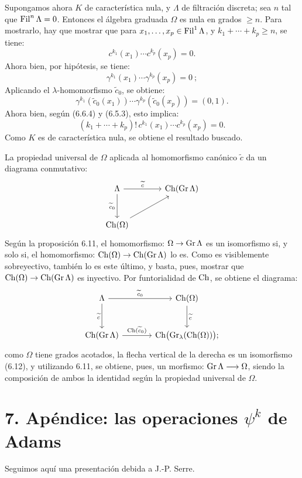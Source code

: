 Supongamos ahora \(K\) de característica nula, y \(\Lambda\) de filtración discreta; sea \(n\) tal que \(\operatorname{Fil}^n\Lambda=0\). Entonces el álgebra graduada \(\Omega\) es nula en grados \(\ge n\). Para mostrarlo, hay que mostrar que para \(x_1,\ldots,x_p\in\operatorname{Fil}^1\Lambda\), y \(k_1+\cdots+k_p\ge n\), se tiene:
\[
  c^{k_1}(x_1)\cdots c^{k_p}(x_p)=0.
\]
Ahora bien, por hipótesis, se tiene:
\[
  \gamma^{k_1}(x_1)\cdots\gamma^{k_p}(x_p)=0\ ;
\]
Aplicando el \(\lambda\)-homomorfismo \(\widetilde c_0\), se obtiene:
\[
  \gamma^{k_1}(\widetilde c_0(x_1))\cdots
  \gamma^{k_p}(\widetilde c_0(x_p))=(0,1).
\]
Ahora bien, según (6.6.4) y (6.5.3), esto implica:
\[
  (k_1+\cdots+k_p)!\,
  c^{k_1}(x_1)\cdots c^{k_p}(x_p)=0.
\]
Como \(K\) es de característica nula, se obtiene el resultado buscado.

La propiedad universal de \(\Omega\) aplicada al homomorfismo canónico \(\widetilde c\) da un diagrama conmutativo:
\[
\begin{tikzcd}[column sep=large,row sep=large]
\Lambda \arrow[r,"\widetilde c"] \arrow[d,"\widetilde c_0"'] &
\Ch(\Gr\Lambda)\\
\Ch(\Omega) \arrow[ur] &
\end{tikzcd}
\]
Según la proposición 6.11, el homomorfismo: \(\Omega\to\operatorname{Gr}\Lambda\) es un isomorfismo si, y solo si, el homomorfismo: \(\operatorname{Ch}(\Omega)\to\operatorname{Ch}(\operatorname{Gr}\Lambda)\) lo es. Como es visiblemente sobreyectivo, también lo es este último, y basta, pues, mostrar que \(\operatorname{Ch}(\Omega)\to\operatorname{Ch}(\operatorname{Gr}\Lambda)\) es inyectivo. Por funtorialidad de \(\operatorname{Ch}\), se obtiene el diagrama:
\[
\begin{tikzcd}[column sep=large,row sep=large]
\Lambda \arrow[r,"\widetilde c_0"] \arrow[d,"\widetilde c"'] &
\Ch(\Omega) \arrow[d,"\widetilde c"]\\
\sisi{\Ch(\Gr\Lambda))}{\Ch(\Gr\Lambda)} \arrow[r,"\Ch(\widetilde c_0)"] &
\Ch\bigl(\Gr_\lambda(\Ch(\Omega))\bigr);
\end{tikzcd}
\]
como \(\Omega\) tiene grados acotados, la flecha vertical de la derecha es un isomorfismo (6.12), y utilizando 6.11, se obtiene, pues, un morfismo: \(\operatorname{Gr}\Lambda\longrightarrow\Omega\), siendo la composición de ambos la identidad según la propiedad universal de \(\Omega\).

\section*{7. Apéndice: las operaciones \(\psi^k\) de Adams}

Seguimos aquí una presentación debida a J.-P. Serre.

